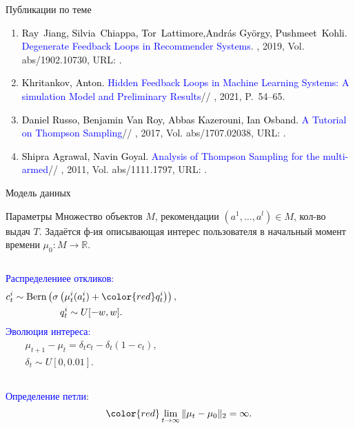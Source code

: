 \documentclass{beamer}
\begin{document}
\begin{frame}{Публикации по теме}
\begin{enumerate}
    \item
      \textcolor{black}{Ray~Jiang, Silvia~Chiappa, Tor~Lattimore,Andr{\'a}s Gy{\"o}rgy, Pushmeet~Kohli.}
      \textcolor{blue}{Degenerate Feedback Loops in Recommender Systems}.
    , 2019, Vol. abs/1902.10730,
	  URL: .

  \item
    \textcolor{black}{Khritankov, Anton.}
    \textcolor{blue}{Hidden Feedback Loops in Machine Learning Systems: A simulation Model and Preliminary Results}//
    , 2021, P.~54--65.

  \item
    \textcolor{black}{Daniel Russo, Benjamin Van Roy, Abbas Kazerouni, Ian Osband.}
    \textcolor{blue}{A Tutorial on Thompson Sampling}//
    , 2017, Vol. abs/1707.02038,
	  URL: .

  \item
    \textcolor{black}{Shipra Agrawal, Navin Goyal.}
    \textcolor{blue}{Analysis of Thompson Sampling for the multi-armed}//
    , 2011, Vol. abs/1111.1797,
	  URL: .
  \end{enumerate}
\end{frame}
\begin{frame}{Модель данных}
  \begin{block}{Параметры}
  Множество объектов $M$, рекомендации $(a^1, \dots, a^l) \in M$, кол-во выдач $T$.
  Задаётся ф-ия описывающая интерес пользователя  в начальный момент времени $\mu_0 : M \to \mathbb{R}$.
\bigskip
\end{block}

\begin{columns}[T]
\textcolor{blue}{Распределениее откликов:}   
\begin{gather*}
    c_t^i \sim \text{Bern} \left(\sigma\left(\mu_t^i (a_t^i) + \mathbin{\color{red} q_t^i } \right) \right), \\ 
    q_t^i \sim U[-w, w].
  \end{gather*}
\textcolor{blue}{Эволюция интереса:}   
  \begin{gather*}
\mu_{t+1} - \mu_{t} = \delta_t c_t - \delta_t (1 - c_t), \\
\delta_t \sim U[0, 0.01].
  \end{gather*}
\end{columns}

\bigskip
\textcolor{blue}{Определение петли}:
\begin{gather*}
  \color{red} \lim_{t \to \infty} \|\mu_t - \mu_0 \|_2 = \infty.
\end{gather*}
\end{frame}
\end{document}
